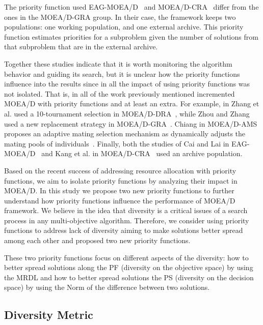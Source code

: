 The priority function used EAG-MOEA/D~\cite{cai2015external} and MOEA/D-CRA~\cite{kang2018collaborative} differ from the ones in the MOEA/D-GRA group. In their case, the framework keeps two populations: one working population, and one external archive. This priority function estimates priorities for a subproblem given the number of solutions from that subproblem that are in the external archive.

Together these studies indicate that it is worth monitoring the algorithm behavior and guiding its search, but it is unclear how the priority functions influence into the results since in all the impact of using priority functions was not isolated. That is, in all of the work previously mentioned incremented MOEA/D with priority functions and at least an extra. For example, in Zhang et al. used a 10-tournament selection in MOEA/D-DRA~\cite{zhang2009performance}, while Zhou and Zhang used a new replacement strategy in MOEA/D-GRA~\cite{zhou2016all}. Chiang in MOEA/D-AMS proposes an adaptive mating selection mechanism as dynamically adjusts the mating pools of individuals~\cite{chiang2011moea}. Finally, both the studies of Cai and Lai in  EAG-MOEA/D~\cite{cai2015external} and Kang et al. in MOEA/D-CRA~\cite{kang2018collaborative} used an archive population.

Based on the recent success of addressing resource allocation with priority functions, we aim to isolate priority functions by analyzing their impact in MOEA/D. In this study we propose two new priority functions to further understand how priority functions influence the performance of MOEA/D framework. We believe in the idea that diversity is a critical issues of a search process in any multi-objective algorithm. Therefore, we consider using priority functions to address lack of diversity aiming to make solutions better spread among each other and proposed two new priority functions. 

These two priority functions focus on different aspects of the diversity:  how to better spread solutions along the PF (diversity on the objective space) by using the MRDL and how to better spread solutions the PS (diversity on the decision space) by using the Norm of the difference between two solutions.



\subsection{Diversity Metric}


